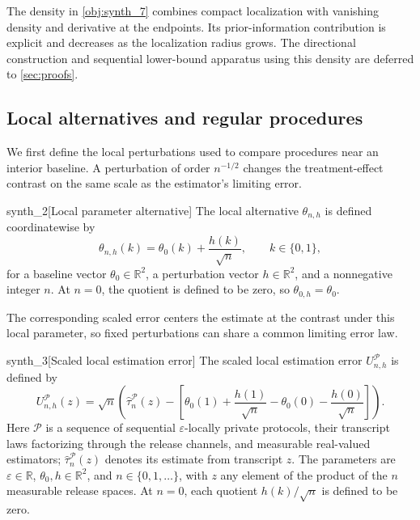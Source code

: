 \documentclass[11pt]{article}
\begin{document}
The density in \cref{obj:synth_7} combines compact localization with vanishing density and derivative at the endpoints. Its prior-information contribution is explicit and decreases as the localization radius grows. The directional construction and sequential lower-bound apparatus using this density are deferred to \cref{sec:proofs}.

\subsection{Local alternatives and regular procedures}

We first define the local perturbations used to compare procedures near an interior baseline. A perturbation of order \(n^{-1/2}\) changes the treatment-effect contrast on the same scale as the estimator's limiting error.

\begin{definitionv}{synth_2}[Local parameter alternative]
The local alternative \(\theta_{n,h}\) is defined coordinatewise by
\[
\theta_{n,h}(k)=\theta_0(k)+\frac{h(k)}{\sqrt n},
\qquad k\in\{0,1\},
\]
for a baseline vector \(\theta_0\in\mathbb R^2\), a perturbation vector \(h\in\mathbb R^2\), and a nonnegative integer \(n\). At \(n=0\), the quotient is defined to be zero, so \(\theta_{0,h}=\theta_0\).
\end{definitionv}

The corresponding scaled error centers the estimate at the contrast under this local parameter, so fixed perturbations can share a common limiting error law.

\begin{definitionv}{synth_3}[Scaled local estimation error]
The scaled local estimation error \(U_{n,h}^{\mathcal P}\) is defined by
\[
U_{n,h}^{\mathcal P}(z)
=
\sqrt n\left(
\widehat\tau_n^{\mathcal P}(z)
-
\left[
\theta_0(1)+\frac{h(1)}{\sqrt n}
-\theta_0(0)-\frac{h(0)}{\sqrt n}
\right]
\right).
\]
Here \(\mathcal P\) is a sequence of sequential \(\varepsilon\)-locally private protocols, their transcript laws factorizing through the release channels, and measurable real-valued estimators; \(\widehat\tau_n^{\mathcal P}(z)\) denotes its estimate from transcript \(z\). The parameters are \(\varepsilon\in\mathbb R\), \(\theta_0,h\in\mathbb R^2\), and \(n\in\{0,1,\ldots\}\), with \(z\) any element of the product of the \(n\) measurable release spaces. At \(n=0\), each quotient \(h(k)/\sqrt n\) is defined to be zero.
\end{definitionv}
\end{document}
